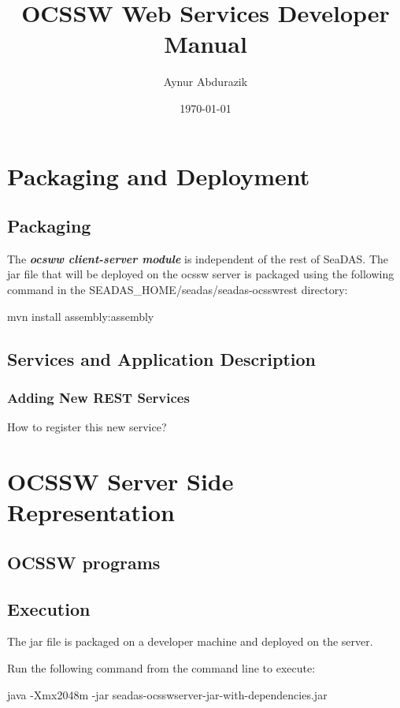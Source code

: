 \documentclass[11pt, oneside]{article}   	%
\title{OCSSW Web Services Developer Manual}
\author{Aynur Abdurazik}
\date{\today}							%
\begin{document}
\maketitle

\section{Packaging and Deployment}
\subsection{Packaging}

The \emph{\textbf{ocsww client-server module}}  is independent of the rest of SeaDAS. The jar file that will be deployed on the ocssw server is packaged using the following command in the \textdollar SEADAS\_HOME/seadas/seadas-ocsswrest directory:

\begin{code}
mvn install assembly:assembly
\end{code}

\subsection{Services and Application Description}

\subsubsection{Adding New REST Services}
How to register this new service?

\section{\color{DarkOrange}OCSSW Server Side Representation}

\subsection{\color{DarkBlue} OCSSW programs}


\subsection{\color{DarkBlue} Execution}

The jar file is packaged on a developer machine and deployed on the server.

Run the following command from the command line to execute:
\begin{code}
﻿java -Xmx2048m -jar seadas-ocsswserver-jar-with-dependencies.jar
\end{code}
\end{document}
